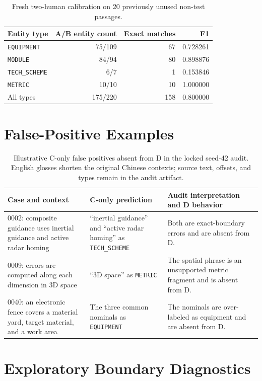 \documentclass[10pt,a4paper]{article}
\newcommand{\entitytype}[1]{\texttt{#1}}
\begin{document}
\begin{table}[ht]
\caption{Fresh two-human calibration on 20 previously unused non-test
passages.}
\label{tab:s-calibration}
\centering
\begin{tabular}{lrrr}
\toprule
Entity type & A/B entity count & Exact matches & F1 \\
\midrule
\entitytype{EQUIPMENT} & 75/109 & 67 & 0.728261 \\
\entitytype{MODULE} & 84/94 & 80 & 0.898876 \\
\entitytype{TECH\_SCHEME} & 6/7 & 1 & 0.153846 \\
\entitytype{METRIC} & 10/10 & 10 & 1.000000 \\
\midrule
All types & 175/220 & 158 & 0.800000 \\
\bottomrule
\end{tabular}
\end{table}

\section*{False-Positive Examples}

\begin{table}[ht]
\caption{Illustrative C-only false positives absent from D in the locked
seed-42 audit. English glosses shorten the original Chinese contexts; source
text, offsets, and types remain in the audit artifact.}
\label{tab:s-fp-examples}
\centering
\small
\begin{tabular}{p{4.8cm}p{4.0cm}p{5.3cm}}
\toprule
Case and context & C-only prediction & Audit interpretation and D behavior \\
\midrule
0002: composite guidance uses inertial guidance and active radar homing &
``inertial guidance'' and ``active radar homing'' as
\entitytype{TECH\_SCHEME} & Both are exact-boundary errors and are absent from D. \\
0009: errors are computed along each dimension in 3D space &
``3D space'' as \entitytype{METRIC} & The spatial phrase is an unsupported
metric fragment and is absent from D. \\
0040: an electronic fence covers a material yard, target material, and a work
area & The three common nominals as \entitytype{EQUIPMENT} & The nominals are
over-labeled as equipment and are absent from D. \\
\bottomrule
\end{tabular}
\end{table}

\section*{Exploratory Boundary Diagnostics}
\end{document}
